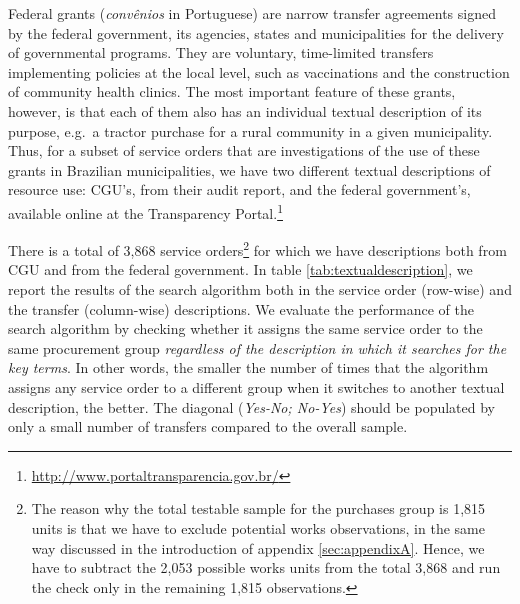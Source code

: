 \documentclass[11pt]{article}
\begin{document}
Federal grants (\emph{convênios} in Portuguese) are narrow transfer
agreements signed by the federal government, its agencies, states and
municipalities for the delivery of governmental programs. They are
voluntary, time-limited transfers implementing policies at the local
level, such as vaccinations and the construction of community health
clinics. The most important feature of these grants, however, is that
each of them also has an individual textual description of its purpose,
e.g.~a tractor purchase for a rural community in a given municipality.
Thus, for a subset of service orders that are investigations of the use
of these grants in Brazilian municipalities, we have two
different textual descriptions of resource use: CGU's, from their audit
report, and the federal government's, available online at the
Transparency Portal.\footnote{\url{http://www.portaltransparencia.gov.br/}}


There is a total of 3,868 service orders\footnote{The reason why the total testable sample for the purchases group is 1,815 units is that we have to exclude potential works observations, in the same way discussed in the introduction of appendix \ref{sec:appendixA}. Hence, we have to subtract the 2,053 possible works units from the total 3,868 and run the check only in the remaining 1,815 observations.} for which we have descriptions both from CGU and from the federal government. In table \ref{tab:textualdescription}, we report the results of the search algorithm both in the service order (row-wise) and the transfer (column-wise) descriptions. We evaluate the performance of the search algorithm by checking whether it assigns the same service order to the same procurement group \emph{regardless of the description in which it searches for the key terms}. In other words, the smaller the number of times that the algorithm assigns any service order to a different group when it switches to another textual description, the better. The diagonal (\emph{Yes-No; No-Yes}) should be populated by only a small number of transfers compared to the overall sample.
\end{document}

